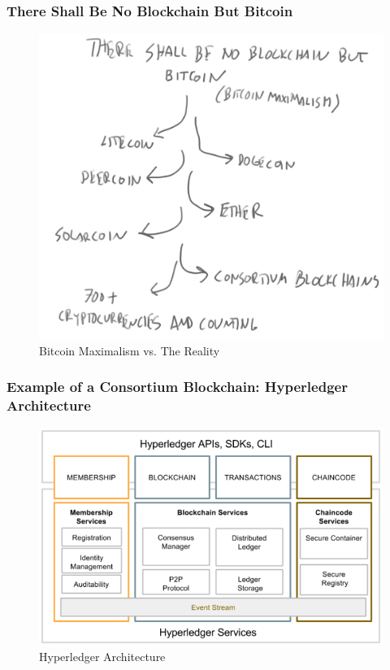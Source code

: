\documentclass[8pt]{beamer}
\begin{document}
\begin{frame}
\frametitle{There Shall Be No Blockchain But Bitcoin}

\begin{figure}[tb]
 \centering
 \includegraphics[width=8 cm,keepaspectratio=true]{./blockchain_images/only_bitcoin.png}
 \caption{Bitcoin Maximalism vs. The Reality}
\end{figure}

\end{frame}

\begin{frame}
\frametitle{Example of a Consortium Blockchain: Hyperledger Architecture}

\begin{figure}[tb]
 \centering
 \includegraphics[width=6 cm,keepaspectratio=true]{./blockchain_images/hyperledger_architecture.png}
 \caption{Hyperledger Architecture}
\end{figure}

\end{frame}
\end{document}
